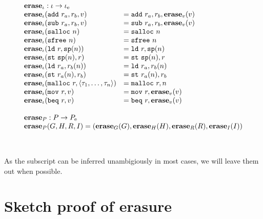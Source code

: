 {\[\begin{array}{l}
\begin{array}{ll}
\rlap{$\erase_{\iota} : \high\iota -> \simple{\iota}$} \\
\erase_{\iota}(\mathtt{add}\ r_a, r_b, \high v) &= \mathtt{add}\ r_a, r_b, \erase_v(\high v) \\
\erase_{\iota}(\mathtt{sub}\ r_a, r_b, \high v) &= \mathtt{sub}\ r_a, r_b, \erase_v(\high v) \\
\erase_{\iota}(\mathtt{salloc}\ n) &= \mathtt{salloc}\ n \\
\erase_{\iota}(\mathtt{sfree}\ n) &= \mathtt{sfree}\ n \\
\erase_{\iota}(\mathtt{ld}\ r, \mathtt{sp}(n)) &= \mathtt{ld}\ r, \mathtt{sp}(n) \\
\erase_{\iota}(\mathtt{st}\ \mathtt{sp}(n), r) &= \mathtt{st}\ \mathtt{sp}(n), r \\
\erase_{\iota}(\mathtt{ld}\ r_a, r_b(n)) &= \mathtt{ld}\ r_a, r_b(n) \\
\erase_{\iota}(\mathtt{st}\ r_a(n), r_b) &= \mathtt{st}\ r_a(n), r_b \\
\erase_{\iota}(\mathtt{malloc}\ r, \langle \tau_1, \dots, \tau_n \rangle) &= \mathtt{malloc}\ r, n \\
\erase_{\iota}(\mathtt{mov}\ r, \high v) &= \mathtt{mov}\ r, \erase_v(\high v) \\
\erase_{\iota}(\mathtt{beq}\ r, \high v) &= \mathtt{beq}\ r, \erase_v(\high v) \\
\end{array} \\\\

\begin{array}{l}
\erase_P : \high P -> \simple{P} \\
\erase_P(\high G, \high H, \high R, \high I) = (\erase_G(\high G), \erase_H(\high H), \erase_R(\high R), \erase_I(\high I)) \\\\
\end{array} \\\\

\end{array}\]
}

As the subscript can be inferred unambigiously in most cases, we will leave them
out when possible.

\section{Sketch proof of erasure}

